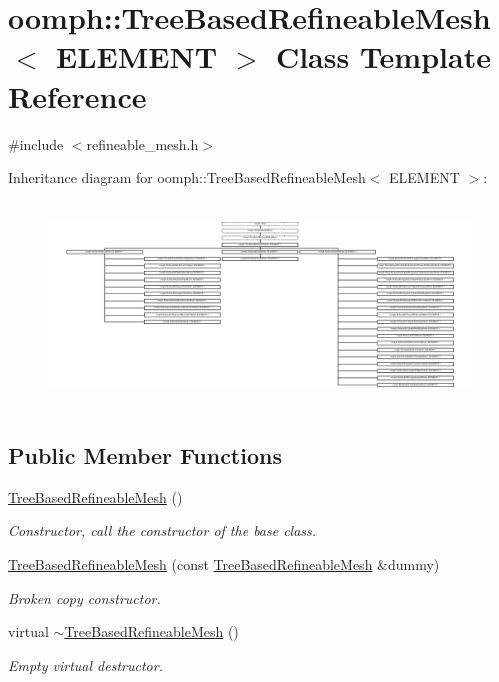 \hypertarget{classoomph_1_1TreeBasedRefineableMesh}{}\section{oomph\+:\+:Tree\+Based\+Refineable\+Mesh$<$ E\+L\+E\+M\+E\+NT $>$ Class Template Reference}
\label{classoomph_1_1TreeBasedRefineableMesh}


{\ttfamily \#include $<$refineable\+\_\+mesh.\+h$>$}

Inheritance diagram for oomph\+:\+:Tree\+Based\+Refineable\+Mesh$<$ E\+L\+E\+M\+E\+NT $>$\+:\begin{figure}[H]
\begin{center}
\leavevmode
\includegraphics[height=5.430303cm]{classoomph_1_1TreeBasedRefineableMesh}
\end{center}
\end{figure}
\subsection*{Public Member Functions}
\begin{DoxyCompactItemize}
\item 
\hyperlink{classoomph_1_1TreeBasedRefineableMesh_a6ac1734d39cf26e7f855b55ac8a3a760}{Tree\+Based\+Refineable\+Mesh} ()
\begin{DoxyCompactList}\small\item\em Constructor, call the constructor of the base class. \end{DoxyCompactList}\item 
\hyperlink{classoomph_1_1TreeBasedRefineableMesh_ac6057aeeec66fb9d0b5bbe0562a6e727}{Tree\+Based\+Refineable\+Mesh} (const \hyperlink{classoomph_1_1TreeBasedRefineableMesh}{Tree\+Based\+Refineable\+Mesh} \&dummy)
\begin{DoxyCompactList}\small\item\em Broken copy constructor. \end{DoxyCompactList}\item 
virtual \hyperlink{classoomph_1_1TreeBasedRefineableMesh_a0c7736c1b102c3699fdad63f2858492f}{$\sim$\+Tree\+Based\+Refineable\+Mesh} ()
\begin{DoxyCompactList}\small\item\em Empty virtual destructor. \end{DoxyCompactList}\end{DoxyCompactItemize}
